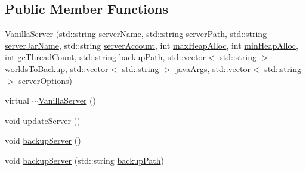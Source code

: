 \subsection*{Public Member Functions}
\begin{DoxyCompactItemize}
\item 
\hyperlink{class_minecraft_server_service_1_1_vanilla_server_a44dada0b6ef71cbc8346fd41dfc9bdbe}{Vanilla\+Server} (std\+::string \hyperlink{class_minecraft_server_service_1_1_vanilla_server_a83d99c03fe7dfc834e06a770b79419b1}{server\+Name}, std\+::string \hyperlink{class_minecraft_server_service_1_1_vanilla_server_a5a706e3f6d83ef1eb38ab2c8e2998955}{server\+Path}, std\+::string \hyperlink{class_minecraft_server_service_1_1_vanilla_server_aa52c191c12cdc8ed91dfbddf40331b62}{server\+Jar\+Name}, std\+::string \hyperlink{class_minecraft_server_service_1_1_vanilla_server_a725f891aea7180f391ba188c67dbdeab}{server\+Account}, int \hyperlink{class_minecraft_server_service_1_1_vanilla_server_ac065cff3dfe1b639259feee3a9f6767c}{max\+Heap\+Alloc}, int \hyperlink{class_minecraft_server_service_1_1_vanilla_server_a5e1519f9ec36c337ea713b4502e37f3f}{min\+Heap\+Alloc}, int \hyperlink{class_minecraft_server_service_1_1_vanilla_server_ad1097ba0b31d2f9f48fdbaf095b0e473}{gc\+Thread\+Count}, std\+::string \hyperlink{class_minecraft_server_service_1_1_vanilla_server_a3e69116180a7fc5acd2a0b934a46c312}{backup\+Path}, std\+::vector$<$ std\+::string $>$ \hyperlink{class_minecraft_server_service_1_1_vanilla_server_aec51859d7b2d8699ea1bba8811092414}{worlds\+To\+Backup}, std\+::vector$<$ std\+::string $>$ \hyperlink{class_minecraft_server_service_1_1_vanilla_server_a5505cb132333925275cafd3d0ef96fd8}{java\+Args}, std\+::vector$<$ std\+::string $>$ \hyperlink{class_minecraft_server_service_1_1_vanilla_server_a374f28043dec2295f0b84267fd181bfc}{server\+Options})
\item 
virtual \hyperlink{class_minecraft_server_service_1_1_vanilla_server_a2c4f857d3ab27184cf421768b85518a6}{$\sim$\+Vanilla\+Server} ()
\item 
void \hyperlink{class_minecraft_server_service_1_1_vanilla_server_a1cecbb185fabf2c2e966b080136a8a41}{update\+Server} ()
\item 
void \hyperlink{class_minecraft_server_service_1_1_vanilla_server_a5c1e812a1961e1487b5d874602951ffe}{backup\+Server} ()
\item 
void \hyperlink{class_minecraft_server_service_1_1_vanilla_server_a7ac1bae67e8ff658ad2b24ac852ffbdf}{backup\+Server} (std\+::string \hyperlink{class_minecraft_server_service_1_1_vanilla_server_a3e69116180a7fc5acd2a0b934a46c312}{backup\+Path})

\end{DoxyCompactItemize}
